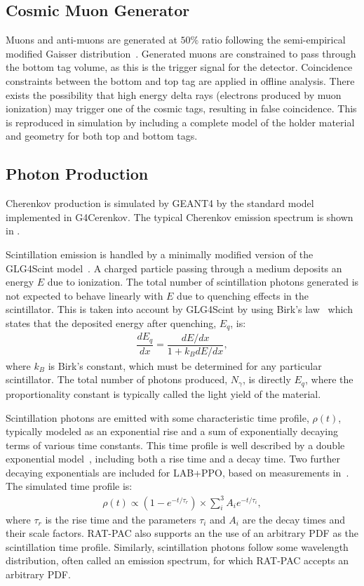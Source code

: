 \subsection{Cosmic Muon Generator}
\label{sec:primarygen}

Muons and anti-muons are generated at $50\%$ ratio following the semi-empirical modified Gaisser distribution~\cite{gaisser-mod}. 
Generated muons are constrained to pass through the bottom tag volume, as this is the trigger signal for the detector. 
Coincidence constraints between the bottom and top tag are applied in offline analysis.
There exists the possibility that high energy delta rays (electrons produced by muon ionization) may trigger one of the cosmic tags, resulting in false coincidence.
This is reproduced in simulation by including a complete model of the holder material and geometry for both top and bottom tags.

\subsection{Photon Production \label{sec:photon_prod}}

Cherenkov production is simulated by GEANT4 by the standard model implemented in G4Cerenkov. 
The typical Cherenkov emission spectrum is shown in .

Scintillation emission is handled by a minimally modified version of the GLG4Scint model~\cite{glg4sim}. 
A charged particle passing through a medium deposits an energy $E$ due to ionization. 
The total number of scintillation photons generated is not expected to behave linearly with $E$ due to quenching effects in the scintillator.
This is taken into account by GLG4Scint by using Birk's law~\cite{birks} which states that the deposited energy after quenching, $E_{q}$, is:
\begin{eqnarray}
	\dfrac{dE_{q}}{dx} = \dfrac{dE/dx}{1+ k_BdE/dx},
    \label{eq:birk}
\end{eqnarray}
where $k_B$ is Birk's constant, which must be determined for any particular scintillator. 
The total number of  photons produced, $N_{\gamma}$, is directly $E_{q}$, where the proportionality constant is typically called the light yield of the material. 

Scintillation photons are emitted with some characteristic time profile, $\rho(t)$, typically modeled as an exponential rise and a sum of exponentially decaying terms of various time constants.
This time profile is well described by a double exponential model~\cite{mcguire_palmer}, including both a rise time and a decay time. 
Two further decaying exponentials are included for LAB+PPO, based on measurements in~\cite{labppo}. The simulated time profile is:
\begin{eqnarray}
\rho(t) \propto (1 - e^{-t/\tau_r}) \times \sum^3_i A_i e^{-t/\tau_i},
\end{eqnarray}
where $\tau_r$ is the rise time and the parameters $\tau_i$ and $A_i$ are the decay times and their scale factors.
RAT-PAC also supports an the use of an arbitrary PDF as the scintillation time profile.
Similarly, scintillation photons follow some wavelength distribution, often called an emission spectrum, for which RAT-PAC accepts an arbitrary PDF.


